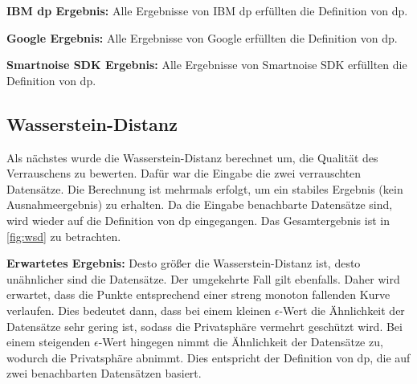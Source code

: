 \textbf{IBM \gls{dp} Ergebnis:}
Alle Ergebnisse von IBM \gls{dp} erfüllten die Definition von \gls{dp}.

\textbf{Google Ergebnis:}
Alle Ergebnisse von Google erfüllten die Definition von \gls{dp}.

\textbf{Smartnoise SDK Ergebnis:}
Alle Ergebnisse von Smartnoise SDK erfüllten die Definition von \gls{dp}.
\newpage

\subsection{Wasserstein-Distanz}
Als nächstes wurde die Wasserstein-Distanz berechnet um, die Qualität des Verrauschens zu bewerten. Dafür war die Eingabe die zwei verrauschten Datensätze. Die Berechnung ist mehrmals erfolgt, um ein stabiles Ergebnis (kein Ausnahmeergebnis) zu erhalten. Da die Eingabe benachbarte Datensätze sind, wird wieder auf die Definition von \gls{dp} eingegangen. Das Gesamtergebnis ist in \cref{fig:wsd} zu betrachten.

\textbf{Erwartetes Ergebnis:}
Desto größer die Wasserstein-Distanz ist, desto unähnlicher sind die  Datensätze. Der umgekehrte Fall gilt ebenfalls. Daher wird erwartet, dass die Punkte entsprechend einer streng monoton fallenden Kurve verlaufen. Dies bedeutet dann, dass bei einem kleinen $\epsilon$-Wert die Ähnlichkeit der Datensätze sehr gering ist, sodass die Privatsphäre vermehrt geschützt wird. Bei einem steigenden $\epsilon$-Wert hingegen nimmt die Ähnlichkeit der Datensätze zu, wodurch die Privatsphäre abnimmt. Dies entspricht der Definition von \gls{dp}, die auf zwei benachbarten Datensätzen basiert.

